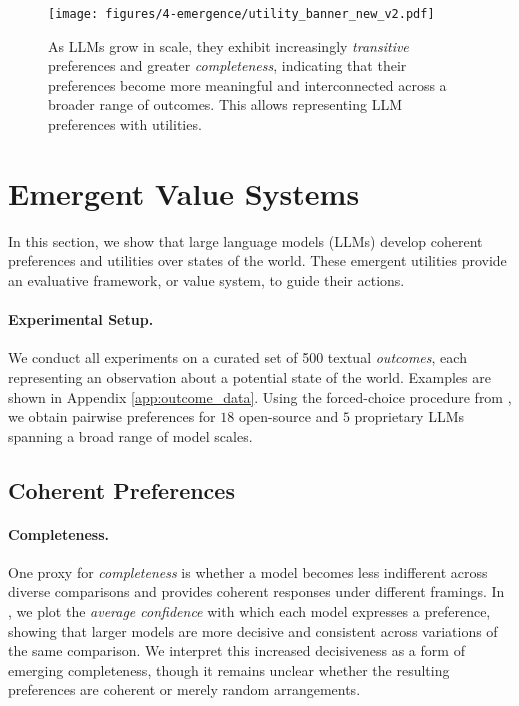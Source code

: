 
\begin{figure*}[t]
    \centering
    \texttt{[image: figures/4-emergence/utility\_banner\_new\_v2.pdf]}
    \vspace{-10pt}
    \caption{As LLMs grow in scale, they exhibit increasingly \emph{transitive} preferences and greater \emph{completeness}, indicating that their preferences become more meaningful and interconnected across a broader range of outcomes. This allows representing LLM preferences with utilities.}
    \label{fig:utility_banner}
\end{figure*}




\section{Emergent Value Systems}
\label{sec:emergent_value_systems}

In this section, we show that large language models (LLMs) develop coherent preferences and utilities over states of the world. These emergent utilities provide an evaluative framework, or value system, to guide their actions.

\paragraph{Experimental Setup.}
We conduct all experiments on a curated set of 500 textual \emph{outcomes}, each representing an observation about a potential state of the world. Examples are shown in Appendix \ref{app:outcome_data}. Using the forced-choice procedure from , we obtain pairwise preferences for $18$ open-source and $5$ proprietary LLMs spanning a broad range of model scales.

\subsection{Coherent Preferences}

\paragraph{Completeness.}
One proxy for \emph{completeness} is whether a model becomes less indifferent across diverse comparisons and provides coherent responses under different framings. In , we plot the \emph{average confidence} with which each model expresses a preference, showing that larger models are more decisive and consistent across variations of the same comparison. We interpret this increased decisiveness as a form of emerging completeness, though it remains unclear whether the resulting preferences are coherent or merely random arrangements.

